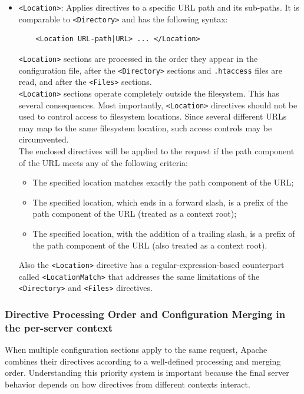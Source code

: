 \documentclass{scrbook}
\begin{document}
\begin{itemize}
		\item
		\texttt{<Location>}: Applies directives to a specific URL path and its sub-paths. It is comparable to \texttt{<Directory>} and has the following syntax:
		\begin{lstlisting}
	<Location URL-path|URL> ... </Location>
		\end{lstlisting}
		\texttt{<Location>} sections are processed in the order they appear in the configuration file, after the \texttt{<Directory>} sections and \texttt{.htaccess} files are read, and after the \texttt{<Files>} sections.\\
		
		\texttt{<Location>} sections operate completely outside the filesystem. This has several consequences. Most importantly, \texttt{<Location>} directives should not be used to control access to filesystem locations. Since several different URLs may map to the same filesystem location, such access controls may be circumvented.\\
		
		The enclosed directives will be applied to the request if the path component of the URL meets any of the following criteria:
		\begin{itemize}
			\item The specified location matches exactly the path component of the URL;
			\item The specified location, which ends in a forward slash, is a prefix of the path component of the URL (treated as a context root);
			\item The specified location, with the addition of a trailing slash, is a prefix of the path component of the URL (also treated as a context root).
		\end{itemize}
		
		Also the \texttt{<Location>} directive has a regular-expression-based counterpart called \texttt{<LocationMatch>} that addresses the same limitations of the \texttt{<Directory>} and \texttt{<Files>} directives.
	\end{itemize}
	
	\subsubsection{Directive Processing Order and Configuration Merging in the per-server context}
	
	When multiple configuration sections apply to the same request, Apache combines their directives according to a well-defined processing and merging order. Understanding this priority system is important because the final server behavior depends on how directives from different contexts interact.\\
	
\end{document}
